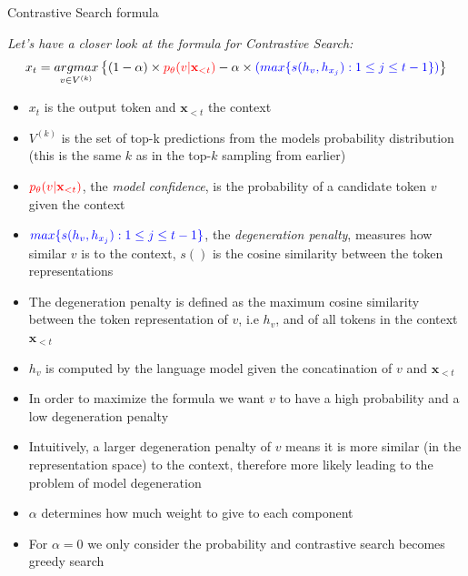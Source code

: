 
\begin{vbframe}{Contrastive Search formula}


\textit{Let's have a closer look at the formula for Contrastive Search:}
\small
$$x_t = \underset{v \in V^{(k)}}{argmax}\left\{(1 - \alpha) \times \textcolor{red}{p_\theta(v|\mathbf{x}_{<t})} - \alpha \times \textcolor{blue}{(max\{s(h_v,h_{x_j}):1\leq j \leq t-1\})}\right\}$$

\begin{itemize}
    \item $x_t$ is the output token and $\mathbf{x}_{<t}$ the context
    \item $V^{(k)}$ is the set of top-k predictions from the models probability distribution (this is the same $k$ as in the top-$k$ sampling from earlier)
    \item $\textcolor{red}{p_\theta(v|\mathbf{x}_{<t})}$, the \textit{model confidence}, is the probability of a candidate token $v$ given the context
    \item $\textcolor{blue}{max\{s(h_v,h_{x_j}):1\leq j \leq t-1\}}$, the \textit{degeneration penalty}, measures how similar $v$ is to the context, $s()$ is the cosine similarity between the token representations
    \item The degeneration penalty is defined as the maximum cosine similarity between the token representation of $v$, i.e $h_v$, and of all tokens in the context $\mathbf{x}_{<t}$
    \item $h_v$ is computed by the language model given the concatination of $v$ and $\mathbf{x}_{<t}$
    \item In order to maximize the formula we want $v$ to have a high probability and a low degeneration penalty
    \item Intuitively, a larger degeneration penalty of $v$ means it is more similar (in the representation space) to the context, therefore more likely leading to the problem of model degeneration
    \item $\alpha$ determines how much weight to give to each component
    \item For $\alpha = 0$ we only consider the probability and contrastive search becomes greedy search
\end{itemize}

\vfill

\end{vbframe}

